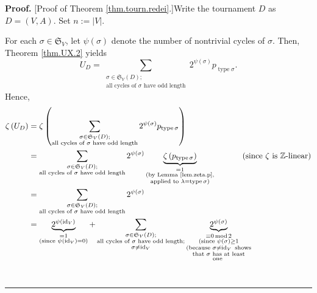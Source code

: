 \documentclass[numbers=enddot,12pt,final,onecolumn,notitlepage]{scrartcl}%
\numberwithin{exer}{section}
\theoremstyle{definition}
\newenvironment{proof}[1][Proof]{\noindent\textbf{#1.} }{\ \rule{0.5em}{0.5em}}
\let\sumnonlimits\sum
\renewcommand{\sum}{\sumnonlimits\limits}
\begin{document}
\begin{proof}
[Proof of Theorem \ref{thm.tourn.redei}.]Write the tournament $D$ as
$D=\left(  V,A\right)  $. Set $n:=\left\vert V\right\vert $.

For each $\sigma\in\mathfrak{S}_{V}$, let $\psi\left(  \sigma\right)  $ denote
the number of nontrivial cycles of $\sigma$. Then, Theorem \ref{thm.UX.2}
yields%
\[
U_{D}=\sum_{\substack{\sigma\in\mathfrak{S}_{V}\left(  D\right)  ;\\\text{all
cycles of }\sigma\text{ have odd length}}}2^{\psi\left(  \sigma\right)
}p_{\operatorname*{type}\sigma}.
\]
Hence,%
\begin{align}
\zeta\left(  U_{D}\right)   &  =\zeta\left(  \sum_{\substack{\sigma
\in\mathfrak{S}_{V}\left(  D\right)  ;\\\text{all cycles of }\sigma\text{ have
odd length}}}2^{\psi\left(  \sigma\right)  }p_{\operatorname*{type}\sigma
}\right) \nonumber\\
&  =\sum_{\substack{\sigma\in\mathfrak{S}_{V}\left(  D\right)  ;\\\text{all
cycles of }\sigma\text{ have odd length}}}2^{\psi\left(  \sigma\right)
}\underbrace{\zeta\left(  p_{\operatorname*{type}\sigma}\right)
}_{\substack{=1\\\text{(by Lemma \ref{lem.zeta.p},}\\\text{applied to }%
\lambda=\operatorname*{type}\sigma\text{)}}}\ \ \ \ \ \ \ \ \ \ \left(
\text{since }\zeta\text{ is }\mathbb{Z}\text{-linear}\right) \nonumber\\
&  =\sum_{\substack{\sigma\in\mathfrak{S}_{V}\left(  D\right)  ;\\\text{all
cycles of }\sigma\text{ have odd length}}}2^{\psi\left(  \sigma\right)
}\label{pf.thm.tourn.redei.zUD=}\\
&  =\underbrace{2^{\psi\left(  \operatorname*{id}\nolimits_{V}\right)  }%
}_{\substack{=1\\\text{(since }\psi\left(  \operatorname*{id}\nolimits_{V}%
\right)  =0\text{)}}}+\sum_{\substack{\sigma\in\mathfrak{S}_{V}\left(
D\right)  ;\\\text{all cycles of }\sigma\text{ have odd length;}\\\sigma
\neq\operatorname*{id}\nolimits_{V}}}\underbrace{2^{\psi\left(  \sigma\right)
}}_{\substack{\equiv0\operatorname{mod}2\\\text{(since }\psi\left(
\sigma\right)  \geq1\\\text{(because }\sigma\neq\operatorname*{id}%
\nolimits_{V}\text{ shows}\\\text{that }\sigma\text{ has at least}\\\text{one
}}}
\end{align}
\end{proof}
\end{document}
